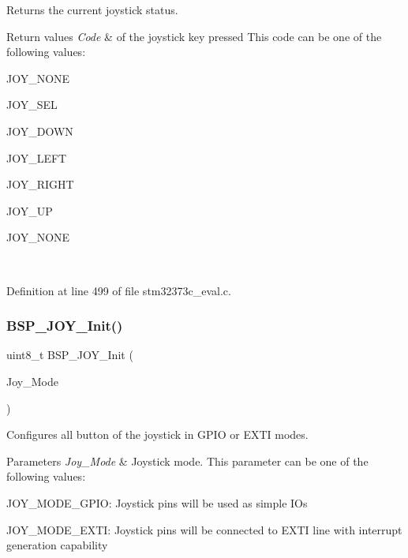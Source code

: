 Returns the current joystick status. 


\begin{DoxyRetVals}{Return values}
{\em Code} & of the joystick key pressed This code can be one of the following values\+: \begin{DoxyItemize}
\item J\+O\+Y\+\_\+\+N\+O\+NE \item J\+O\+Y\+\_\+\+S\+EL \item J\+O\+Y\+\_\+\+D\+O\+WN \item J\+O\+Y\+\_\+\+L\+E\+FT \item J\+O\+Y\+\_\+\+R\+I\+G\+HT \item J\+O\+Y\+\_\+\+UP \item J\+O\+Y\+\_\+\+N\+O\+NE \end{DoxyItemize}
\\
\hline
\end{DoxyRetVals}


Definition at line 499 of file stm32373c\+\_\+eval.\+c.

\mbox{\label{group___exported___functions_ga1a5bc41baa164f7941e51ec747589c55}} 
\subsubsection{B\+S\+P\+\_\+\+J\+O\+Y\+\_\+\+Init()}
{\footnotesize\ttfamily uint8\+\_\+t B\+S\+P\+\_\+\+J\+O\+Y\+\_\+\+Init (\begin{DoxyParamCaption}\item[{\textbf{ J\+O\+Y\+Mode\+\_\+\+Type\+Def}}]{Joy\+\_\+\+Mode }\end{DoxyParamCaption})}



Configures all button of the joystick in G\+P\+IO or E\+X\+TI modes. 


\begin{DoxyParams}{Parameters}
{\em Joy\+\_\+\+Mode} & Joystick mode. This parameter can be one of the following values\+: \begin{DoxyItemize}
\item J\+O\+Y\+\_\+\+M\+O\+D\+E\+\_\+\+G\+P\+IO\+: Joystick pins will be used as simple I\+Os \item J\+O\+Y\+\_\+\+M\+O\+D\+E\+\_\+\+E\+X\+TI\+: Joystick pins will be connected to E\+X\+TI line with interrupt generation capability ~\newline
\end{DoxyItemize}
\\
\hline
\end{DoxyParams}

